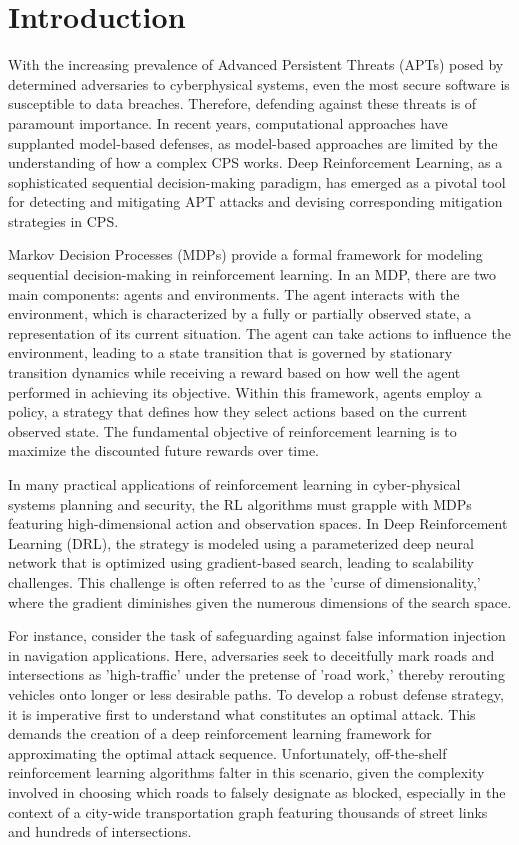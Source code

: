 \chapter{Introduction}
\label{chap:intro}

With the increasing prevalence of Advanced Persistent Threats (APTs) posed by determined adversaries to cyberphysical systems, even the most secure software is susceptible to data breaches. Therefore, defending against these threats is of paramount importance. In recent years, computational approaches have supplanted model-based defenses, as model-based approaches are limited by the understanding of how a complex CPS works. Deep Reinforcement Learning, as a sophisticated sequential decision-making paradigm, has emerged as a pivotal tool for detecting and mitigating APT attacks and devising corresponding mitigation strategies in CPS.

Markov Decision Processes (MDPs) provide a formal framework for modeling sequential decision-making in reinforcement learning. In an MDP, there are two main components: agents and environments. The agent interacts with the environment, which is characterized by a fully or partially observed state, a representation of its current situation. The agent can take actions to influence the environment, leading to a state transition that is governed by stationary transition dynamics while receiving a reward based on how well the agent performed in achieving its objective. Within this framework, agents employ a policy, a strategy that defines how they select actions based on the current observed state. The fundamental objective of reinforcement learning is to maximize the discounted future rewards over time.

In many practical applications of reinforcement learning in cyber-physical systems planning and security, the RL algorithms must grapple with MDPs featuring high-dimensional action and observation spaces. In Deep Reinforcement Learning (DRL), the strategy is modeled using a parameterized deep neural network that is optimized using gradient-based search, leading to scalability challenges. This challenge is often referred to as the 'curse of dimensionality,' where the gradient diminishes given the numerous dimensions of the search space. 

For instance, consider the task of safeguarding against false information injection in navigation applications. Here, adversaries seek to deceitfully mark roads and intersections as 'high-traffic' under the pretense of 'road work,' thereby rerouting vehicles onto longer or less desirable paths. To develop a robust defense strategy, it is imperative first to understand what constitutes an optimal attack. This demands the creation of a deep reinforcement learning framework for approximating the optimal attack sequence. Unfortunately, off-the-shelf reinforcement learning algorithms falter in this scenario, given the complexity involved in choosing which roads to falsely designate as blocked, especially in the context of a city-wide transportation graph featuring thousands of street links and hundreds of intersections.

